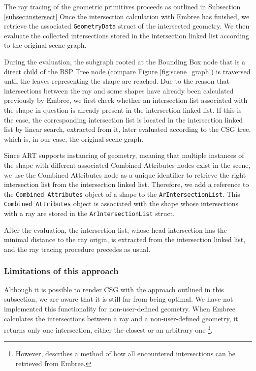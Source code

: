 The ray tracing of the geometric primitives proceeds as outlined in Subsection \ref{subsec:instersect}
Once the intersection calculation with Embree has finished, we retrieve the associated \texttt{GeometryData} struct of the intersected geometry. We then evaluate the collected intersections stored in the intersection linked list according to the original scene graph.

During the evaluation, the subgraph rooted at the Bounding Box node that is a direct child of the BSP Tree node (compare Figure \ref{fig:scene_graph}) is traversed until the leaves representing the shape are reached. Due to the reason that intersections between the ray and some shapes have already been calculated previously by Embree, we first check whether an intersection list associated with the shape in question is already present in the intersection linked list. If this is the case, the corresponding intersection list is located in the intersection linked list by linear search, extracted from it, later evaluated according to the CSG tree, which is, in our case, the original scene graph.

Since ART supports instancing of geometry, meaning that multiple instances of the shape with different associated Combined Attributes nodes exist in the scene, we use the Combined Attributes node as a unique identifier to retrieve the right intersection list from the intersection linked list.
Therefore, we add a reference to the \texttt{Combined Attributes} object of a shape to the \texttt{ArIntersectionList}. This \texttt{Combined Attributes} object is associated with the shape whose intersections with a ray are stored in the \texttt{ArIntersectionList} struct.


After the evaluation, the intersection list, whose head intersection has the minimal distance to the ray origin, is extracted from the intersection linked list, and the ray tracing procedure precedes as usual.

\subsubsection{Limitations of this approach}

Although it is possible to render CSG with the approach outlined in this subsection, we are aware that it is still far from being optimal. We have not implemented this functionality for non-user-defined geometry. When Embree calculates the intersections between a ray and a non-user-defined geometry, it returns only one intersection, either the closest or an arbitrary one \footnote{However, \cite{karaffova2016} describes a method of how all encountered intersections can be retrieved from Embree.}.


